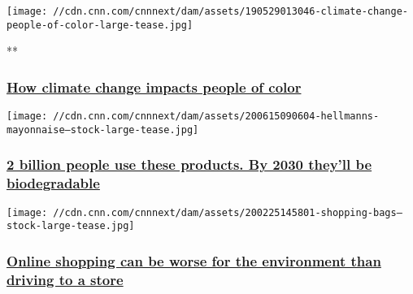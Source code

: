 \href{/videos/world/2019/05/29/how-climate-change-impacts-people-of-color-weir-dnt-vpx.cnn}{}

\texttt{[image: //cdn.cnn.com/cnnnext/dam/assets/190529013046-climate-change-people-of-color-large-tease.jpg]}

**

\hypertarget{how-climate-change-impacts-people-of-color-}{%
\subsubsection{\texorpdfstring{\href{/videos/world/2019/05/29/how-climate-change-impacts-people-of-color-weir-dnt-vpx.cnn}{How
climate change impacts people of color
}}{How climate change impacts people of color }}\label{how-climate-change-impacts-people-of-color-}}

\href{/2020/06/15/business/unilever-climate-change-commitments/index.html}{}

\texttt{[image: //cdn.cnn.com/cnnnext/dam/assets/200615090604-hellmanns-mayonnaise---stock-large-tease.jpg]}

\hypertarget{2-billion-people-use-these-products-by-2030-theyll-be-biodegradable}{%
\subsubsection{\texorpdfstring{\href{/2020/06/15/business/unilever-climate-change-commitments/index.html}{2
billion people use these products. By 2030 they'll be
biodegradable}}{2 billion people use these products. By 2030 they'll be biodegradable}}\label{2-billion-people-use-these-products-by-2030-theyll-be-biodegradable}}

\href{/2020/02/26/tech/greenhouse-gas-emissions-retail/index.html}{}

\texttt{[image: //cdn.cnn.com/cnnnext/dam/assets/200225145801-shopping-bags---stock-large-tease.jpg]}

\hypertarget{online-shopping-can-be-worse-for-the-environment-than-driving-to-a-store}{%
\subsubsection{\texorpdfstring{\href{/2020/02/26/tech/greenhouse-gas-emissions-retail/index.html}{Online
shopping can be worse for the environment than driving to a
store}}{Online shopping can be worse for the environment than driving to a store}}\label{online-shopping-can-be-worse-for-the-environment-than-driving-to-a-store}}

